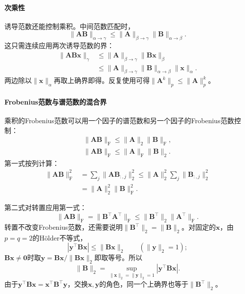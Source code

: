 \paragraph{次乘性}
诱导范数还能控制乘积。中间范数匹配时，
\begin{equation}
 \lVert\bm A\bm B\rVert_{\alpha\to\gamma}
 \leq\lVert\bm A\rVert_{\beta\to\gamma}
 \lVert\bm B\rVert_{\alpha\to\beta}.
 \label{eq:ls-induced-norm-submultiplicative}
\end{equation}
这只需连续应用两次诱导范数的界：
\[
 \begin{aligned}
 \lVert\bm A\bm B\bm x\rVert_\gamma
 &\leq\lVert\bm A\rVert_{\beta\to\gamma}\lVert\bm B\bm x\rVert_\beta\\
 &\leq\lVert\bm A\rVert_{\beta\to\gamma}\lVert\bm B\rVert_{\alpha\to\beta}\lVert\bm x\rVert_\alpha.
 \end{aligned}
\]
两边除以$\lVert\bm x\rVert_\alpha$再取上确界即得。反复使用可得$\lVert\bm A^k\rVert_p\leq\lVert\bm A\rVert_p^k$。

\paragraph{Frobenius范数与谱范数的混合界}
乘积的Frobenius范数可以用一个因子的谱范数和另一个因子的Frobenius范数控制：
\begin{equation}
\begin{gathered}
\lVert\bm A\bm B\rVert_{\mathrm F}
 \leq\lVert\bm A\rVert_2\lVert\bm B\rVert_{\mathrm F},\\
\lVert\bm A\bm B\rVert_{\mathrm F}
 \leq\lVert\bm A\rVert_{\mathrm F}\lVert\bm B\rVert_2.
\end{gathered}
\label{eq:matrix-analysis-mixed-submultiplicativity}
\end{equation}
第一式按列计算：
\[
 \begin{aligned}
 \lVert\bm A\bm B\rVert_{\mathrm F}^2
 &=\sum_j\lVert\bm A\bm B_{:,j}\rVert_2^2
 \leq\lVert\bm A\rVert_2^2\sum_j\lVert\bm B_{:,j}\rVert_2^2\\
 &=\lVert\bm A\rVert_2^2\lVert\bm B\rVert_{\mathrm F}^2.
 \end{aligned}
\]

第二式对转置应用第一式：
\[
 \lVert\bm A\bm B\rVert_{\mathrm F}=\lVert\bm B^\top\bm A^\top\rVert_{\mathrm F}\leq\lVert\bm B^\top\rVert_2\lVert\bm A^\top\rVert_{\mathrm F}.
\]
转置不改变Frobenius范数，还需要说明$\lVert\bm B^\top\rVert_2=\lVert\bm B\rVert_2$。对固定的$\bm x$，由$p=q=2$的Hölder不等式，
\[
 |\bm y^\top\bm B\bm x|\leq\lVert\bm B\bm x\rVert_2\qquad(\lVert\bm y\rVert_2=1);
\]
$\bm B\bm x\neq\bm0$时取$\bm y=\bm B\bm x/\lVert\bm B\bm x\rVert_2$即取等号。所以
\[
 \lVert\bm B\rVert_2=\sup_{\lVert\bm x\rVert_2=\lVert\bm y\rVert_2=1}|\bm y^\top\bm B\bm x|.
\]
由于$\bm y^\top\bm B\bm x=\bm x^\top\bm B^\top\bm y$，交换$\bm x,\bm y$的角色，同一个上确界也等于$\lVert\bm B^\top\rVert_2$。

